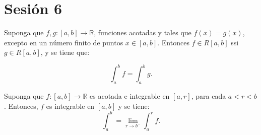 \section{Sesión 6}


\begin{teorema}
	Suponga que $f,g:[a,b]\to\mathbb{R}$, funciones acotadas y tales que $f(x)=g(x)$, excepto en un número finito de puntos $x\in[a,b]$. Entonces $f\in R[a,b]$ ssi $g\in R[a,b]$, y se tiene que: 
	
	$$\int_a^b f=\int_a^b g.$$
\end{teorema}


\begin{prop}
	Suponga que $f:[a,b]\to\mathbb{R}$ es acotada e integrable en $[a,r]$, para cada $a<r<b$. Entonces, $f$ es integrable en $[a,b]$ y se tiene: 
	$$\int_a^b=\lim_{r\to b^-}\int_a^r f.$$
\end{prop}
